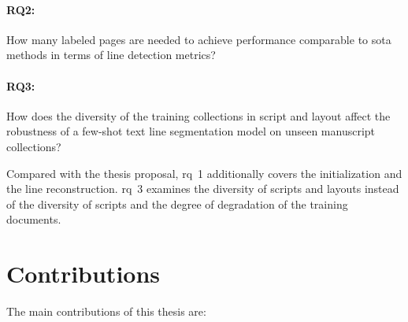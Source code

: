 \paragraph{RQ2:} How many labeled pages are needed to achieve performance comparable to \gls{sota} methods in terms of line detection metrics?

\paragraph{RQ3:} How does the diversity of the training collections in script and layout affect the robustness of a few-shot text line segmentation model on unseen manuscript collections?

Compared with the thesis proposal, \gls{rq}~1 additionally covers the initialization and the line reconstruction. \Gls{rq}~3 examines the diversity of scripts and layouts instead of the diversity of scripts and the degree of degradation of the training documents.


\section{Contributions}

The main contributions of this thesis are:

